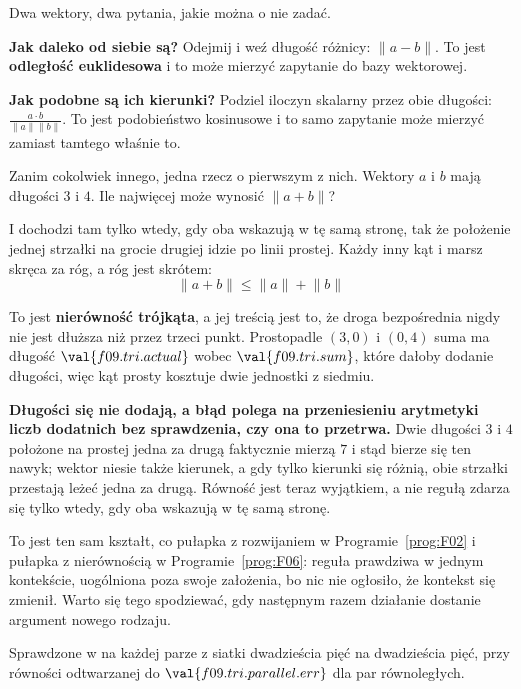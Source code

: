 \begin{fr}
Dwa wektory, dwa pytania, jakie można o nie zadać.

\textbf{Jak daleko od siebie są?} Odejmij i weź długość różnicy:
$\lVert a - b \rVert$. To jest \textbf{odległość euklidesowa} i to może
mierzyć zapytanie do bazy wektorowej.

\textbf{Jak podobne są ich kierunki?} Podziel iloczyn skalarny przez obie
długości: $\frac{a \cdot b}{\lVert a \rVert \lVert b \rVert}$. To jest
podobieństwo kosinusowe i to samo zapytanie może mierzyć zamiast tamtego
właśnie to.

Zanim cokolwiek innego, jedna rzecz o pierwszym z nich. Wektory $a$ i $b$ mają
długości $3$ i $4$. Ile najwięcej może wynosić $\lVert a + b \rVert$?
\nextframe
\end{fr}

\begin{fr}
I dochodzi tam tylko wtedy, gdy oba wskazują w tę samą stronę, tak że
położenie jednej strzałki na grocie drugiej idzie po linii prostej. Każdy inny
kąt i marsz skręca za róg, a róg jest skrótem:
\[ \lVert a + b \rVert \le \lVert a \rVert + \lVert b \rVert \]

To jest \textbf{nierówność trójkąta}, a jej treścią jest to, że droga
bezpośrednia nigdy nie jest dłuższa niż przez trzeci punkt. Prostopadle
\dash{} $(3, 0)$ i $(0, 4)$ \dash{} suma ma długość $\val{f09.tri.actual}$
wobec $\val{f09.tri.sum}$, które dałoby dodanie długości, więc kąt prosty
kosztuje dwie jednostki z siedmiu.

\begin{trapbox}
\textbf{Długości się nie dodają, a błąd polega na przeniesieniu arytmetyki
liczb dodatnich bez sprawdzenia, czy ona to przetrwa.} Dwie długości $3$ i $4$
położone na prostej jedna za drugą faktycznie mierzą $7$ i stąd bierze się ten
nawyk; wektor niesie także kierunek, a gdy tylko kierunki się różnią, obie
strzałki przestają leżeć jedna za drugą. Równość jest teraz wyjątkiem, a nie
regułą \dash{} zdarza się tylko wtedy, gdy oba wskazują w tę samą stronę.

To jest ten sam kształt, co pułapka z rozwijaniem w Programie~\ref{prog:F02} i
pułapka z nierównością w Programie~\ref{prog:F06}: reguła prawdziwa w jednym
kontekście, uogólniona poza swoje założenia, bo nic nie ogłosiło, że kontekst
się zmienił. Warto się tego spodziewać, gdy następnym razem działanie dostanie
argument nowego rodzaju.

Sprawdzone w  na każdej parze z siatki
dwadzieścia pięć na dwadzieścia pięć, przy równości odtwarzanej do
$\val{f09.tri.parallel.err}$ dla par równoległych.
\end{trapbox}
\end{fr}

